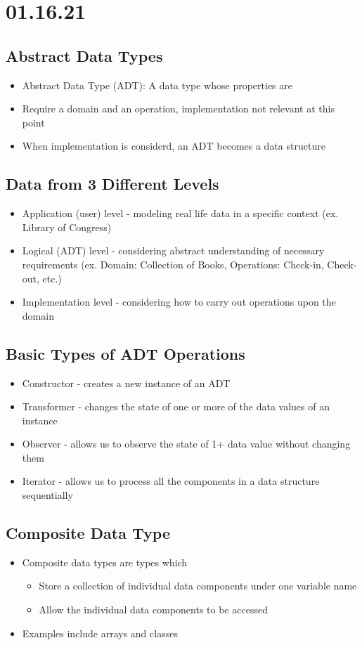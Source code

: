 \documentclass[11pt]{article}
\author{Sudhan Chitgopkar}
\date{\today}
\title{}
\begin{document}
\tableofcontents \clearpage\section{01.16.21}
\label{sec:orgc0fbaaa}
\subsection{Abstract Data Types}
\label{sec:org24a7c44}
\begin{itemize}
\item Abstract Data Type (ADT): A data type whose properties are
\item Require a domain and an operation, implementation not relevant at this point
\item When implementation is considerd, an ADT becomes a data structure
\end{itemize}
\subsection{Data from 3 Different Levels}
\label{sec:orgfb3c7ca}
\begin{itemize}
\item Application (user) level - modeling real life data in a specific context (ex. Library of Congress)
\item Logical (ADT) level - considering abstract understanding of necessary requirements (ex. Domain: Collection of Books, Operations: Check-in, Check-out, etc.)
\item Implementation level - considering how to carry out operations upon the domain
\end{itemize}
\subsection{Basic Types of ADT Operations}
\label{sec:org47b102c}
\begin{itemize}
\item Constructor - creates a new instance of an ADT
\item Transformer - changes the state of one or more of the data values of an instance
\item Observer - allows us to observe the state of 1+ data value without changing them
\item Iterator - allows us to process all the components in a data structure sequentially
\end{itemize}
\subsection{Composite Data Type}
\label{sec:orgbffa1a8}
\begin{itemize}
\item Composite data types are types which
\begin{itemize}
\item Store a collection of individual data components under one variable name
\item Allow the individual data components to be accessed
\end{itemize}
\item Examples include arrays and classes
\end{itemize}
\end{document}
